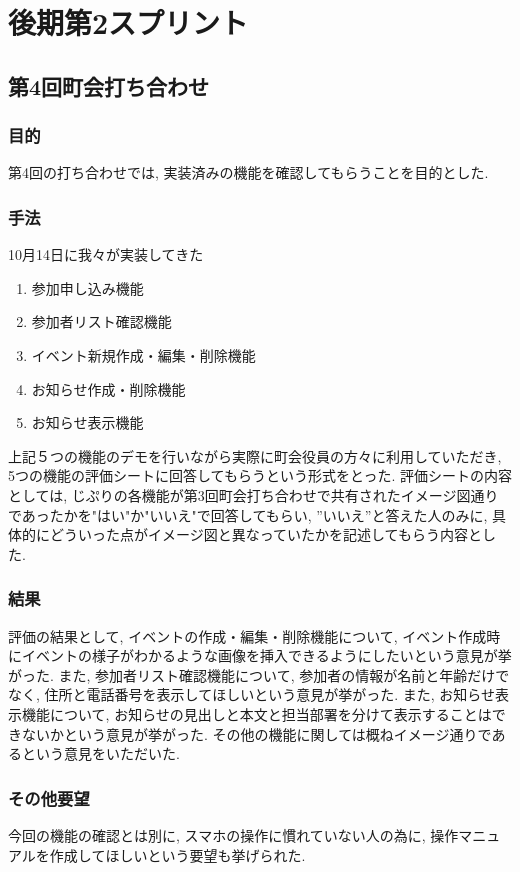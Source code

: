 \section{後期第2スプリント}
\subsection{第4回町会打ち合わせ}
\subsubsection{目的}
第4回の打ち合わせでは, 実装済みの機能を確認してもらうことを目的とした.
\subsubsection{手法}
10月14日に我々が実装してきた
\begin{enumerate}
    \item 参加申し込み機能
    \item 参加者リスト確認機能
    \item イベント新規作成・編集・削除機能
    \item お知らせ作成・削除機能
    \item お知らせ表示機能
\end{enumerate}
上記５つの機能のデモを行いながら実際に町会役員の方々に利用していただき, 5つの機能の評価シートに回答してもらうという形式をとった.
評価シートの内容としては, じぷりの各機能が第3回町会打ち合わせで共有されたイメージ図通りであったかを"はい"か"いいえ"で回答してもらい,
”いいえ”と答えた人のみに, 具体的にどういった点がイメージ図と異なっていたかを記述してもらう内容とした.
\subsubsection{結果}
評価の結果として, イベントの作成・編集・削除機能について, イベント作成時にイベントの様子がわかるような画像を挿入できるようにしたいという意見が挙がった.
また, 参加者リスト確認機能について, 参加者の情報が名前と年齢だけでなく, 住所と電話番号を表示してほしいという意見が挙がった.
また, お知らせ表示機能について, お知らせの見出しと本文と担当部署を分けて表示することはできないかという意見が挙がった.
その他の機能に関しては概ねイメージ通りであるという意見をいただいた.
\subsubsection{その他要望}
今回の機能の確認とは別に, スマホの操作に慣れていない人の為に, 操作マニュアルを作成してほしいという要望も挙げられた.

